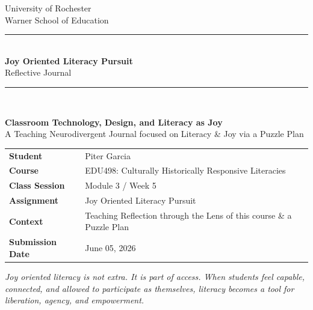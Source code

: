 \documentclass[11pt]{article}
\begin{document}
\begin{titlepage}
\thispagestyle{empty}

\begin{center}
\vspace*{0.25in}
{\large University of Rochester\\}
{\normalsize Warner School of Education\\[0.35in]}

{\color{PrimaryRed}\rule{\textwidth}{1.4pt}}\\[0.22in]
{\Huge\bfseries Joy Oriented Literacy Pursuit\\[0.12in]}
{\Large Reflective Journal\\[0.22in]}
{\color{PrimaryRed}\rule{0.72\textwidth}{0.7pt}}\\[0.32in]

\colorbox{SoftBlue}{%
\parbox{0.86\textwidth}{%
\centering\vspace{0.12in}
\textbf{Classroom Technology, Design, and Literacy as Joy}\\[0.05in]
A Teaching Neurodivergent Journal focused on Literacy \& Joy via a Puzzle Plan
\vspace{0.12in}
}%
}
\end{center}

\vspace{0.4in}

\begin{center}
\renewcommand{\arraystretch}{1.35}
\begin{tabular}{>{\bfseries\RaggedLeft}p{1.55in} p{4.85in}}
Student & Piter Garcia \\
Course & EDU498: Culturally Historically Responsive Literacies \\
Class Session & Module 3 / Week 5 \\
Assignment & Joy Oriented Literacy Pursuit \\
Context & Teaching Reflection through the Lens of this course \& a Puzzle Plan\\
Submission Date & June 05, 2026 \\
\end{tabular}
\end{center}

\vspace{0.4in}

\begin{center}
\begin{minipage}{0.86\textwidth}
\itshape
Joy oriented literacy is not extra. It is part of access. When students feel capable, connected, and allowed to participate as themselves, literacy becomes a tool for liberation, agency, and empowerment.


\end{minipage}
\end{center}
\end{titlepage}
\end{document}
